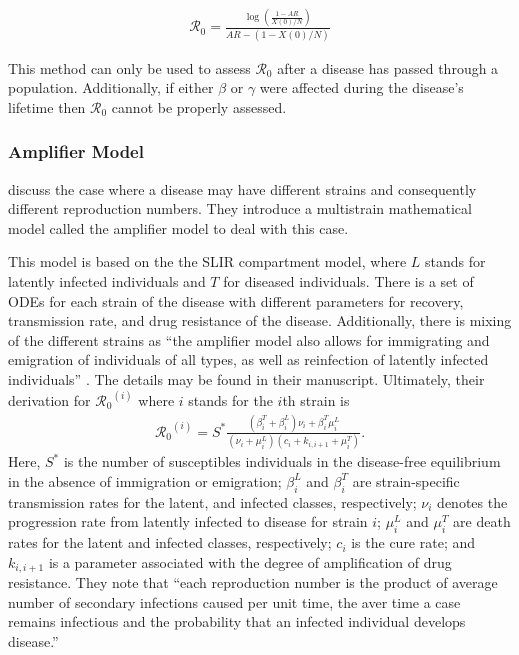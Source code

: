\documentclass[12pt]{article}
\newcommand{\rr}{\ensuremath{\mathcal{R}_0}}
\begin{document}
\begin{align}\label{r0_attackrate}
\rr =  \frac{\log \left (\frac{1  - AR}{X(0)/N}  \right ) }{AR - (1 - X(0)/N)}
\end{align}

This method can only be used to assess $\rr$ after a disease has passed through a population.  Additionally, if either $\beta$ or $\gamma$ were affected during the disease's lifetime then $\rr$ cannot be properly assessed.


\subsubsection{Amplifier Model}
\cite{blower2004} discuss the case where a disease may have different strains and consequently different reproduction numbers.  They introduce a multistrain mathematical model called the amplifier model to deal with this case.

This model is based on the the SLIR compartment model, where $L$ stands for latently infected individuals and $T$ for diseased individuals.  There is a set of ODEs for each strain of the disease with different parameters for recovery, transmission rate, and drug resistance of the disease.  Additionally, there is mixing of the different strains as ``the amplifier model also allows for immigrating and emigration of individuals of all types, as well as reinfection of latently infected individuals'' \citep{blower2004}.  The details may be found in their manuscript.  Ultimately, their derivation for $\rr^{(i)}$ where $i$ stands for the $i$th strain is
\begin{align*}
\rr^{(i)} = S^* \frac{ ( \beta_i^T + \beta_i^L)\nu_i + \beta_i^T \mu_i^L}{(\nu_i + \mu_i^L)(c_i + k_{i,i+1} + \mu_i^T)}.
\end{align*}
Here, $S^*$ is the number of susceptibles individuals in the disease-free equilibrium in the absence of immigration or emigration; $\beta_i^L$ and $\beta_i^T$ are strain-specific transmission rates for the latent, and infected classes, respectively; $\nu_i$ denotes the progression rate from latently infected to disease for strain $i$; $\mu_i^L$ and $\mu_i^{T}$ are death rates for the latent and infected classes, respectively; $c_i$ is the cure rate; and $k_{i, i+1}$ is a parameter associated with the degree of amplification of drug resistance.  They note that ``each reproduction number is the product of average number of secondary infections caused per unit time, the aver time a case remains infectious and the probability that an infected individual develops disease.''
\end{document}
